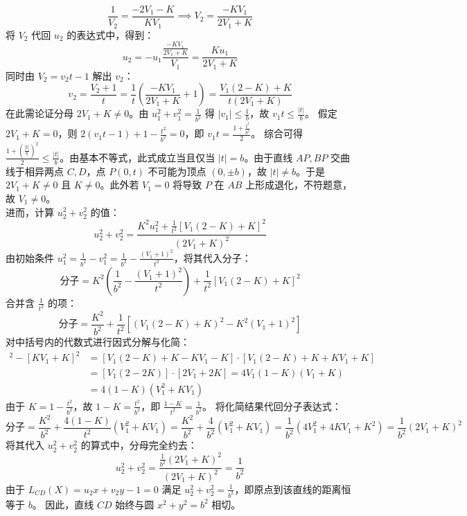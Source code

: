 \begin{solution}
$$\frac{1}{V_2} = \frac{-2V_1 - K}{K V_1} \implies V_2 = \frac{-K V_1}{2V_1 + K}$$
将 $V_2$ 代回 $u_2$ 的表达式中，得到：
$$u_2 = -u_1 \frac{\frac{-K V_1}{2V_1 + K}}{V_1} = \frac{K u_1}{2V_1 + K}$$
同时由 $V_2 = v_2 t - 1$ 解出 $v_2$：
$$v_2 = \frac{V_2 + 1}{t} = \frac{1}{t} \left( \frac{-K V_1}{2V_1 + K} + 1 \right) = \frac{V_1(2 - K) + K}{t(2V_1 + K)}$$
在此需论证分母 $2V_1 + K \neq 0$。由 $u_1^2 + v_1^2 = \frac{1}{b^2}$ 得 $|v_1| \le \frac{1}{b}$，故 $v_1 t \le \frac{|t|}{b}$。
假定 $2V_1 + K = 0$，则 $2(v_1 t - 1) + 1 - \frac{t^2}{b^2} = 0$，即 $v_1 t = \frac{1 + \frac{t^2}{b^2}}{2}$。
综合可得 $\frac{1 + (\frac{|t|}{b})^2}{2} \le \frac{|t|}{b}$。由基本不等式，此式成立当且仅当 $|t| = b$。由于直线 $AP, BP$ 交曲线于相异两点 $C,D$，点 $P(0,t)$ 不可能为顶点 $(0, \pm b)$，故 $|t| \neq b$。于是 $2V_1 + K \neq 0$ 且 $K \neq 0$。此外若 $V_1 = 0$ 将导致 $P$ 在 $AB$ 上形成退化，不符题意，故 $V_1 \neq 0$。\\
进而，计算 $u_2^2 + v_2^2$ 的值：
$$u_2^2 + v_2^2 = \frac{K^2 u_1^2 + \frac{1}{t^2} [V_1(2 - K) + K]^2}{(2V_1 + K)^2}$$
由初始条件 $u_1^2 = \frac{1}{b^2} - v_1^2 = \frac{1}{b^2} - \frac{(V_1 + 1)^2}{t^2}$，将其代入分子：
$$\text{分子} = K^2 \left( \frac{1}{b^2} - \frac{(V_1 + 1)^2}{t^2} \right) + \frac{1}{t^2} [V_1(2 - K) + K]^2$$
合并含 $\frac{1}{t^2}$ 的项：
$$\text{分子} = \frac{K^2}{b^2} + \frac{1}{t^2} \left[ (V_1(2 - K) + K)^2 - K^2(V_1 + 1)^2 \right]$$
对中括号内的代数式进行因式分解与化简：
\begin{align*}
[V_1(2 - K) + K]^2 - [K V_1 + K]^2 &= [V_1(2 - K) + K - K V_1 - K] \cdot [V_1(2 - K) + K + K V_1 + K] \\
&= [V_1(2 - 2K)] \cdot [2 V_1 + 2K] = 4 V_1 (1 - K) (V_1 + K) \\
&= 4(1 - K)(V_1^2 + K V_1)
\end{align*}
由于 $K = 1 - \frac{t^2}{b^2}$，故 $1 - K = \frac{t^2}{b^2}$，即 $\frac{1 - K}{t^2} = \frac{1}{b^2}$。
将化简结果代回分子表达式：
$$\text{分子} = \frac{K^2}{b^2} + \frac{4(1 - K)}{t^2} (V_1^2 + K V_1) = \frac{K^2}{b^2} + \frac{4}{b^2} (V_1^2 + K V_1) = \frac{1}{b^2} (4 V_1^2 + 4 K V_1 + K^2) = \frac{1}{b^2} (2V_1 + K)^2$$
将其代入 $u_2^2 + v_2^2$ 的算式中，分母完全约去：
$$u_2^2 + v_2^2 = \frac{\frac{1}{b^2} (2V_1 + K)^2}{(2V_1 + K)^2} = \frac{1}{b^2}$$
由于 $L_{CD}(X) = u_2 x + v_2 y - 1 = 0$ 满足 $u_2^2 + v_2^2 = \frac{1}{b^2}$，即原点到该直线的距离恒等于 $b$。
因此，直线 $CD$ 始终与圆 $x^2 + y^2 = b^2$ 相切。
\end{solution}


